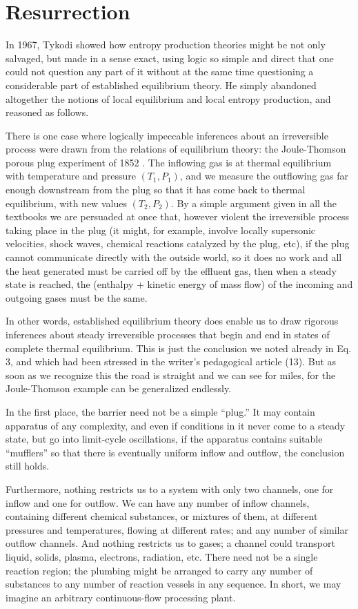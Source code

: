 \documentclass{article}
\begin{document}
\section{Resurrection}

In 1967, Tykodi \cite{tykodi1967} showed how entropy production theories might be not only salvaged, but made in a sense exact, using logic so simple and direct that one could not question any part of it without at the same time questioning a considerable part of established equilibrium theory. He simply abandoned altogether the notions of local equilibrium and local entropy production, and reasoned as follows.

There is one case where logically impeccable inferences about an irreversible process were drawn from the relations of equilibrium theory: the Joule-Thomson porous plug experiment of 1852 . The inflowing gas is at thermal equilibrium with temperature and pressure $\left(T_1, P_1\right)$, and we measure the outflowing gas far enough downstream from the plug so that it has come back to thermal equilibrium, with new values $\left(T_2, P_2\right)$. By a simple argument given in all the textbooks we are persuaded at once that, however violent the irreversible process taking place in the plug (it might, for example, involve locally supersonic velocities, shock waves, chemical reactions catalyzed by the plug, etc), if the plug cannot communicate directly with the outside world, so it does no work and all the heat generated must be carried off by the effluent gas, then when a steady state is reached, the (enthalpy + kinetic energy of mass flow) of the incoming and outgoing gases must be the same.

In other words, established equilibrium theory does enable us to draw rigorous inferences about steady irreversible processes that begin and end in states of complete thermal equilibrium. This is just the conclusion we noted already in Eq. 3, and which had been stressed in the writer's pedagogical article (13). But as soon as we recognize this the road is straight and we can see for miles, for the Joule-Thomson example can be generalized endlessly.

In the first place, the barrier need not be a simple ``plug.'' It may contain apparatus of any complexity, and even if conditions in it never come to a steady state, but go into limit-cycle oscillations, if the apparatus contains suitable ``mufflers'' so that there is eventually uniform inflow and outflow, the conclusion still holds.

Furthermore, nothing restricts us to a system with only two channels, one for inflow and one for outflow. We can have any number of inflow channels, containing different chemical substances, or mixtures of them, at different pressures and temperatures, flowing at different rates; and any number of similar outflow channels. And nothing restricts us to gases; a channel could transport liquid, solids, plasma, electrons, radiation, etc. There need not be a single reaction region; the plumbing might be arranged to carry any number of substances to any number of reaction vessels in any sequence. In short, we may imagine an arbitrary continuous-flow processing plant.
\end{document}
